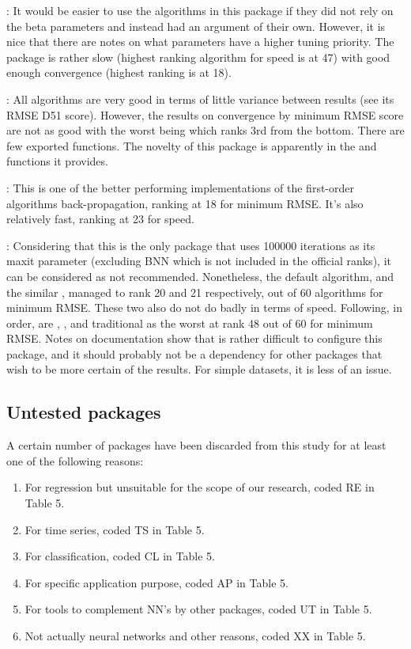  \citep{R-automl}: It would be easier to use the
algorithms in this package if they did not rely on the beta parameters
and instead had an argument of their own. However, it is nice that there
are notes on what parameters have a higher tuning priority. The package
is rather slow (highest ranking algorithm for speed is  at
47) with good enough convergence (highest ranking is  at 18).

 \citep{R-deepdive}: All algorithms are very good in terms
of little variance between results (see its RMSE D51 score). However,
the results on convergence by minimum RMSE score are not as good with
the worst being  which ranks 3rd from the bottom.
There are few exported functions. The novelty of this package is
apparently in the  and  functions it
provides.

 \citep{R-deepnet}: This is one of the better
performing implementations of the first-order algorithms
back-propagation, ranking at 18 for minimum RMSE. It's also relatively
fast, ranking at 23 for speed.

 \citep{R-neuralnet}: Considering that this is the
only package that uses 100000 iterations as its maxit parameter
(excluding BNN which is not included in the official ranks), it can be
considered as not recommended. Nonetheless, the default algorithm,
 and the similar , managed to rank 20 and 21
respectively, out of 60 algorithms for minimum RMSE. These two also do
not do badly in terms of speed. Following, in order, are ,
, and traditional  as the worst at rank 48 out
of 60 for minimum RMSE. Notes on documentation show that is rather
difficult to configure this package, and it should probably not be a
dependency for other packages that wish to be more certain of the
results. For simple datasets, it is less of an issue.

\hypertarget{untested-packages}{%
\subsection{Untested packages}\label{untested-packages}}

A certain number of packages have been discarded from this study for at
least one of the following reasons:

\begin{enumerate}
\def\labelenumi{\arabic{enumi}.}
\tightlist
\item
  For regression but unsuitable for the scope of our research, coded RE
  in Table 5.
\item
  For time series, coded TS in Table 5.
\item
  For classification, coded CL in Table 5.
\item
  For specific application purpose, coded AP in Table 5.
\item
  For tools to complement NN's by other packages, coded UT in Table 5.
\item
  Not actually neural networks and other reasons, coded XX in Table 5.
\end{enumerate}

